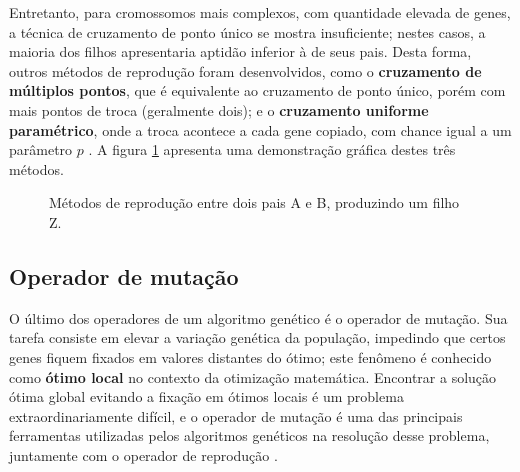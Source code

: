 \documentclass[12pt]{article}
\begin{document}
Entretanto, para cromossomos mais complexos, com quantidade elevada de genes, a técnica de cruzamento de ponto único se mostra insuficiente; nestes casos, a maioria dos filhos apresentaria aptidão inferior à de seus pais. Desta forma, outros métodos de reprodução foram desenvolvidos, como o \textbf{cruzamento de múltiplos pontos}, que é equivalente ao cruzamento de ponto único, porém com mais pontos de troca (geralmente dois); e o \textbf{cruzamento uniforme paramétrico}, onde a troca acontece a cada gene copiado, com chance igual a um parâmetro $p$ \cite{Mitchell1998}. A figura \ref{fig:crossover} apresenta uma demonstração gráfica destes três métodos.

\begin{figure}[ht]
    \centering
    \hspace{0.8cm}
    \hspace{0.8cm}
    \caption{Métodos de reprodução entre dois pais A e B, produzindo um filho Z.}
    \label{fig:crossover}
\end{figure}

\subsection{Operador de mutação} \label{sec:mutation}

O último dos operadores de um algoritmo genético é o operador de mutação. Sua tarefa consiste em elevar a variação genética da população, impedindo que certos genes fiquem fixados em valores distantes do ótimo; este fenômeno é conhecido como \textbf{ótimo local} no contexto da otimização matemática. Encontrar a solução ótima global evitando a fixação em ótimos locais é um problema extraordinariamente difícil, e o operador de mutação é uma das principais ferramentas utilizadas pelos algoritmos genéticos na resolução desse problema, juntamente com o operador de reprodução \cite{Mitchell1998}.
\end{document}
